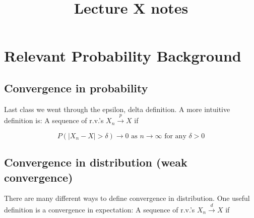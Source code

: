 \documentclass[aos,preprint]{imsart}
\numberwithin{equation}{section}
\theoremstyle{plain}
\begin{document}
\begin{frontmatter}

\title{Lecture X notes}

\address{Christopher Gagne \\ Shamindra Shrotriya \\ Peter Sujan \\ \today}






\end{frontmatter}


\section{Relevant Probability Background}

\subsection{Convergence in probability}
Last class we went through the epsilon, delta definition. A more intuitive definition is: A sequence of r.v.'s ${{X_n}} \xrightarrow{p} X $ if 

$$ P(|X_n - X | > \delta) \rightarrow 0 \text{ as } n \rightarrow \infty \text{ for any } \delta>0 $$

\subsection{Convergence in distribution (weak convergence)}
There are many different ways to define convergence in distribution. One useful definition is a convergence in expectation: A sequence of r.v.'s ${{X_n}} \xrightarrow{d} X $ if 
\end{document}
